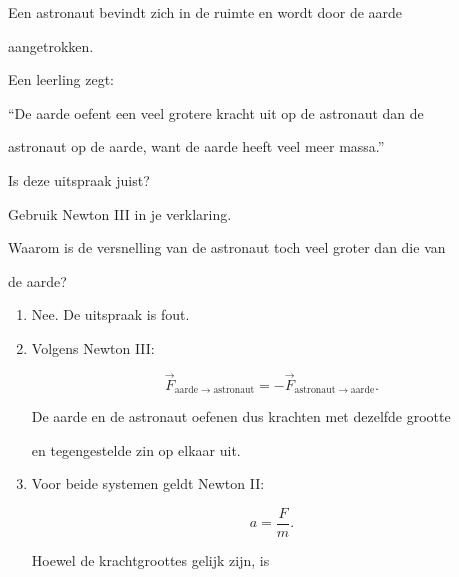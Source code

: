 \documentclass{ximera}
\begin{document}
\begin{oefening}{\oefU\ESS}

Een astronaut bevindt zich in de ruimte en wordt door de aarde

aangetrokken.

Een leerling zegt:

\begin{center} ``De aarde oefent een veel grotere kracht uit op de astronaut dan de

astronaut op de aarde, want de aarde heeft veel meer massa.''

\end{center}

\begin{question}

Is deze uitspraak juist?

\end{question}

\begin{question}

Gebruik Newton III in je verklaring.

\end{question}

\begin{question}

Waarom is de versnelling van de astronaut toch veel groter dan die van

de aarde?

\end{question}


\begin{oplossing}

\begin{enumerate}

  \item Nee. De uitspraak is fout.

  \item Volgens Newton III:

  \[\boxed{ \vec F_{\mathrm{aarde}\rightarrow\mathrm{astronaut}} = -\vec F_{\mathrm{astronaut}\rightarrow\mathrm{aarde}} }.\]

  De aarde en de astronaut oefenen dus krachten met dezelfde grootte

  en tegengestelde zin op elkaar uit.

  \item Voor beide systemen geldt Newton II:

  \[a=\frac{F}{m}.\]

  Hoewel de krachtgroottes gelijk zijn, is


\end{enumerate}
\end{oplossing}
\end{oefening}
\end{document}
